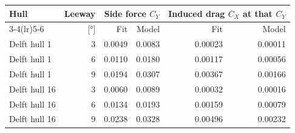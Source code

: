\begin{tabular}{@{}lrrrrr@{}}
\toprule
Hull & Leeway & \multicolumn{2}{c}{Side force \(C_Y\)} & \multicolumn{2}{c}{Induced drag \(C_X\) at that \(C_Y\)} \\
\cmidrule(lr){3-4}\cmidrule(lr){5-6}
 & [\si{\degree}] & Fit & Model & Fit & Model \\
\midrule
Delft hull 1 & 3 & 0.0049 & 0.0083 & 0.00023 & 0.00011 \\
Delft hull 1 & 6 & 0.0110 & 0.0180 & 0.00117 & 0.00056 \\
Delft hull 1 & 9 & 0.0194 & 0.0307 & 0.00367 & 0.00166 \\
Delft hull 16 & 3 & 0.0060 & 0.0089 & 0.00032 & 0.00016 \\
Delft hull 16 & 6 & 0.0134 & 0.0193 & 0.00159 & 0.00079 \\
Delft hull 16 & 9 & 0.0238 & 0.0328 & 0.00496 & 0.00232 \\
\bottomrule
\end{tabular}
